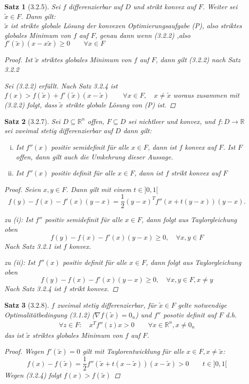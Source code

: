 \documentclass[ngerman,halfparskip]{scrartcl}
\newtheorem*{satz}{Satz}
\theoremstyle{definition}
\def\R{\mathbb R}
\begin{document}
\begin{satz}[3.2.5]
Sei $f$ differenzierbar auf $D$ und strikt konvex auf $F$. Weiter sei $\tilde x \in F$. Dann gilt: \\
$\tilde x$ ist strikte globale Lösung der konvexen Optimierungsaufgabe (P), also striktes globales Minimum von $f$ auf $F$, genau dann wenn (3.2.2) ,also $f'(\tilde x)(x-x\tilde x)\geq 0 \qquad \forall x\in F$
\begin{proof}
Ist $\tilde x$ striktes globales Minimum von $f$ auf $F$, dann gilt (3.2.2) nach Satz 3.2.2

Sei (3.2.2) erfüllt. Nach Satz 3.2.4 ist $f(x)>f(\tilde x)+f'(\tilde x)(x-\tilde x) \qquad \forall x\in F, \quad x\neq \tilde x$ woraus zusammen mit (3.2.2) folgt, dass $\tilde x$ strikte globale Lösung von (P) ist.
\end{proof}
\end{satz}

\begin{satz}[3.2.7]
Sei $D\subseteq \R^n$ offen, $F\subseteq D$ sei nichtleer und konvex, und $f:D\to\R$ sei zweimal stetig differenzierbar auf $D$ dann gilt:
\begin{enumerate}[(i)]
\item Ist $f''(x)$ positiv semidefinit für alle $x\in F$, dann ist $f$ konvex auf $F$. Ist $F$ offen, dann gilt auch die Umkehrung dieser Aussage.
\item Ist $f''(x)$ positiv definit für alle $x\in F$, dann ist $f$ strikt konvex auf $F$
\end{enumerate}
\begin{proof}
Seien $x,y\in F$. Dann gilt mit einem $t\in ]0,1[$ $$f(y)-f(x)-f'(x)(y-x)=\frac 12 (y-x)^Tf''(x+t(y-x))(y-x).$$ 

zu (i): Ist $f''$ positiv semidefinit für alle $x\in F$, dann folgt aus Taylorgleichung oben $$f(y)-f(x)-f'(x)(y-x)\geq 0, \quad \forall x,y\in F$$ Nach Satz 3.2.1 ist $f$ konvex.

zu (ii): Ist $f''(x)$ positiv definit für alle $x\in F$, dann folgt aus Taylorgleichung oben $$f(y)-f(x)-f'(x)(y-x)\geq 0, \quad \forall x,y\in F, x\neq y$$ Nach Satz 3.2.4 ist $f$ strikt konvex.
\end{proof}
\end{satz}


\begin{satz}[3.2.8]
$f$ zweimal stetig differenzierbar, für $\tilde x  \in F$ gelte notwendige Optimalitätbedingung (3.1.2) ($\nabla f (\tilde x)=0_n$) und $f''$ posotiv definit auf $F$ d.h. 
\begin{gather}\tag{3.2.4}
\forall z\in F: \quad x^Tf''(z)x>0 \qquad \forall x\in\R^n, x\neq 0_n
\end{gather}
das ist $\tilde x$ striktes globales Minimum von $f$ auf $F$.

\begin{proof}Wegen $f'(\tilde x)=0$ gilt mit Taylorentwicklung für alle $x\in F, x\neq \tilde x$: 
$$f(x)-f(\tilde x)=\frac 12 f''(\tilde x+t(x-\tilde x))(x-\tilde x)>0 \qquad t\in]0,1[$$ Wegen (3.2.4) folgt $f(x)>f(\tilde x)$
\end{proof}
\end{satz}
\end{document}

